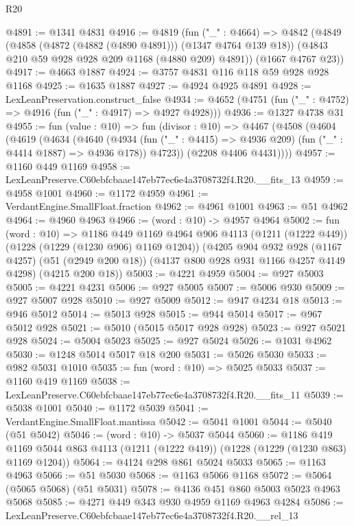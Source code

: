 \begin{lexlean}{R20}
\begin{coremodule}
@4891 := @1341 @4831
@4916 := @4819
    (fun ("_" : @4664) =>
    @4842
      (@4849
        (@4858 (@4872 (@4882 (@4890 @4891))) (@1347 @4764 @139 @18))
        (@4843 @210 @59 @928 @928 @209 @1168 (@4880 @209) @4891))
      (@1667 @4767 @23))
@4917 := @4663 @1887
@4924 := @3757 @4831 @116 @118 @59 @928 @928 @1168
@4925 := @1635 @1887
@4927 := @4924 @4925 @4891
@4928 := LexLeanPreservation.construct_false
@4934 := @4652 (@4751 (fun ("_" : @4752) => @4916 (fun ("_" : @4917) => @4927 @4928)))
@4936 := @1327 @4738 @31
@4955 := fun (value : @10) =>
  fun (divisor : @10) =>
  @4467
    (@4508
      (@4604
        (@4619
          (@4634
            (@4640
              (@4934 (fun ("_" : @4415) => @4936 @209) (fun ("_" : @4414 @1887) => @4936 @178))
              @4723))
          (@2208 @4406 @4431))))
@4957 := @1160 @449 @1169
@4958 := LexLeanPreserve.C60ebfcbaae147eb77ec6e4a3708732f4.R20.__fits_13
@4959 := @4958 @1001
@4960 := @1172 @4959
@4961 := VerdantEngine.SmallFloat.fraction
@4962 := @4961 @1001
@4963 := @51 @4962
@4964 := @4960 @4963
@4966 := (word : @10) -> @4957 @4964
@5002 := fun (word : @10) =>
  @1186
    @449
    @1169
    @4964
    @906
    @4113
    (@1211 (@1222 @449))
    (@1228 (@1229 (@1230 @906) @1169 @1204))
    (@4205
      @904
      @932
      @928
      (@1167 @4257)
      (@51 (@2949 @200 @18))
      (@4137 @800 @928 @931 @1166 @4257 @4149 @4298)
      (@4215 @200 @18))
@5003 := @4221 @4959
@5004 := @927 @5003
@5005 := @4221 @4231
@5006 := @927 @5005
@5007 := @5006 @930
@5009 := @927 @5007 @928
@5010 := @927 @5009
@5012 := @947 @4234 @18
@5013 := @946 @5012
@5014 := @5013 @928
@5015 := @944 @5014
@5017 := @967 @5012 @928
@5021 := @5010 (@5015 @5017 @928 @928)
@5023 := @927 @5021 @928
@5024 := @5004 @5023
@5025 := @927 @5024
@5026 := @1031 @4962
@5030 := @1248 @5014 @5017 @18 @200
@5031 := @5026 @5030
@5033 := @982 @5031 @1010
@5035 := fun (word : @10) => @5025 @5033
@5037 := @1160 @419 @1169
@5038 := LexLeanPreserve.C60ebfcbaae147eb77ec6e4a3708732f4.R20.__fits_11
@5039 := @5038 @1001
@5040 := @1172 @5039
@5041 := VerdantEngine.SmallFloat.mantissa
@5042 := @5041 @1001
@5044 := @5040 (@51 @5042)
@5046 := (word : @10) -> @5037 @5044
@5060 := @1186
    @419
    @1169
    @5044
    @863
    @4113
    (@1211 (@1222 @419))
    (@1228 (@1229 (@1230 @863) @1169 @1204))
@5064 := @4124 @298 @861 @5024 @5033
@5065 := @1163 @4963
@5066 := @51 @5030
@5068 := @1163 @5066 @1168
@5072 := @5064 (@5065 @5068) (@51 @5031)
@5078 := @4136 @451 @860 @5003 @5023 @4963 @5068
@5085 := @4271 @449 @343 @930 @4959 @1169 @4963 @4284
@5086 := LexLeanPreserve.C60ebfcbaae147eb77ec6e4a3708732f4.R20.__rel_13

\end{coremodule}
\end{lexlean}
